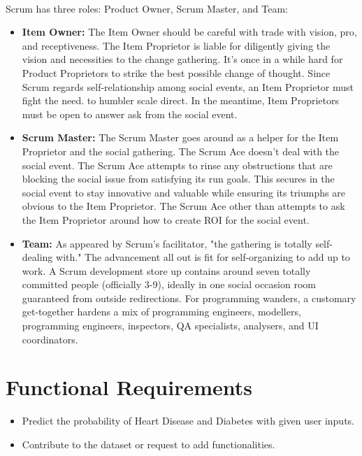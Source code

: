 \documentclass[oneside,12pt]{Classes/VTU}
\begin{document}
		\paragraph{}
    	Scrum has three roles: Product Owner, Scrum Master, and Team:
    	\begin{itemize}
    		\item \textbf{Item Owner:} The Item Owner should be careful with trade with vision, pro, and receptiveness. The Item Proprietor is liable for diligently giving the vision and necessities to the change gathering. It's once in a while hard for Product Proprietors to strike the best possible change of thought. Since Scrum regards self-relationship among social events, an Item Proprietor must fight the need. to humbler scale direct. In the meantime, Item Proprietors must be open to answer ask from the social event.
    		
    		\item \textbf{Scrum Master:} The Scrum Master goes around as a helper for the Item Proprietor and the social gathering. The Scrum Ace doesn't deal with the social event. The Scrum Ace attempts to rinse any obstructions that are blocking the social issue from satisfying its run goals. This secures in the social event to stay innovative and valuable while ensuring its triumphs are obvious to the Item Proprietor. The Scrum Ace other than attempts to ask the Item Proprietor around how to create ROI for the social event.
    		
    		\item \textbf{Team:} As appeared by Scrum's facilitator, "the gathering is totally self-dealing with." The advancement all out is fit for self-organizing to add up to work. A Scrum development store up contains around seven totally committed people (officially 3-9), ideally in one social occasion room guaranteed from outside redirections. For programming wanders, a customary get-together hardens a mix of programming engineers, modellers, programming engineers, inspectors, QA specialists, analysers, and UI coordinators.
    	\end{itemize}
    	
    	
    	\section{Functional Requirements}
    	\begin{itemize}
    		\item Predict the probability of Heart Disease and Diabetes with given user inputs.
    		\item Contribute to the dataset or request to add functionalities.
    	\end{itemize}
    
\end{document}

